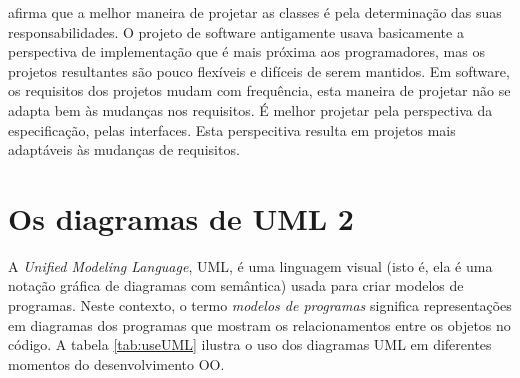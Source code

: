  afirma que a melhor maneira de projetar as classes é pela determinação das suas responsabilidades. O projeto de software antigamente usava basicamente a perspectiva de implementação que é mais próxima aos programadores, mas os projetos resultantes são pouco flexíveis e difíceis de serem mantidos. Em software, os requisitos dos projetos mudam com frequência, esta maneira de projetar não se adapta bem às mudanças nos requisitos. É melhor projetar pela perspectiva da especificação, pelas interfaces. Esta perspecitiva resulta em projetos mais adaptáveis às mudanças de requisitos.

\section{Os diagramas de UML 2}

A \textit{Unified Modeling Language}, UML, é uma linguagem visual (isto é, ela é uma notação gráfica de diagramas com semântica) usada para criar modelos de programas. Neste contexto, o termo \textit{modelos de programas} significa representações em diagramas dos programas que mostram os relacionamentos entre os objetos no código. A tabela \ref{tab:useUML} ilustra o uso dos diagramas UML em diferentes momentos do desenvolvimento OO.

